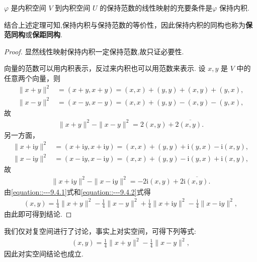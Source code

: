 \documentclass[../../main.tex]{subfiles}
\begin{document}
\begin{theorem}\label{theorem:保范线性映射一定保持内积}
$\varphi$ 是内积空间 $V$ 到内积空间 $U$ 的保持范数的线性映射的充要条件是$\varphi$ 保持内积.
\end{theorem}
\begin{remark}
结合上述定理可知,保持内积与保持范数的等价性，因此保持内积的同构也称为\textbf{保范同构}或\textbf{保距同构}. 
\end{remark}
\begin{proof}
显然线性映射保持内积一定保持范数,故只证必要性.

向量的范数可以用内积表示，反过来内积也可以用范数来表示. 设 $x,y$ 是 $V$ 中的任意两个向量，则
\begin{align*}
\|x + y\|^2&=(x + y,x + y)=(x,x)+(y,y)+(x,y)+(y,x),\\
\|x - y\|^2&=(x - y,x - y)=(x,x)+(y,y)-(x,y)-(y,x),
\end{align*}
故
\begin{align}
\|x + y\|^2 - \|x - y\|^2 = 2(x,y) + 2\overline{(x,y)}.\label{equation::---9.4.1}
\end{align}
另一方面，
\begin{align*}
\|x + \mathrm{i}y\|^2&=(x + \mathrm{i}y,x + \mathrm{i}y)=(x,x)+(y,y)+\mathrm{i}(y,x)-\mathrm{i}(x,y),\\
\|x - \mathrm{i}y\|^2&=(x - \mathrm{i}y,x - \mathrm{i}y)=(x,x)+(y,y)-\mathrm{i}(y,x)+\mathrm{i}(x,y),
\end{align*}
故
\begin{align}
\|x + \mathrm{i}y\|^2 - \|x - \mathrm{i}y\|^2 = -2\mathrm{i}(x,y) + 2\mathrm{i}\overline{(x,y)}.\label{equation::---9.4.2}
\end{align}
由\eqref{equation::---9.4.1}式和\eqref{equation::---9.4.2}式得
\begin{align*}
(x,y) = \frac{1}{4}\|x + y\|^2 - \frac{1}{4}\|x - y\|^2 + \frac{\mathrm{i}}{4}\|x + \mathrm{i}y\|^2 - \frac{\mathrm{i}}{4}\|x - \mathrm{i}y\|^2,
\end{align*}
由此即可得到结论.

\end{proof}
\begin{remark}
我们仅对复空间进行了讨论，事实上对实空间，可得下列等式:
\begin{align*}
(x,y) = \frac{1}{4}\|x + y\|^2 - \frac{1}{4}\|x - y\|^2,
\end{align*}
因此对实空间结论也成立. 
\end{remark}
\end{document}
